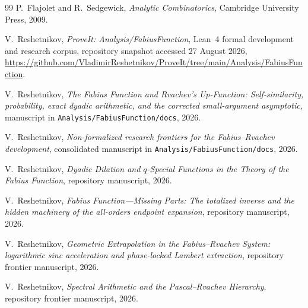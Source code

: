 \documentclass[11pt,oneside]{article}
\theoremstyle{frontier}
\theoremstyle{definition}
\theoremstyle{remark}
\begin{document}
\begin{thebibliography}{99}
P.~Flajolet and R.~Sedgewick,
\newblock \emph{Analytic Combinatorics},
\newblock Cambridge University Press, 2009.

V.~Reshetnikov,
\newblock \emph{ProveIt: Analysis/FabiusFunction},
\newblock Lean~4 formal development and research corpus, repository snapshot accessed
27 August 2026,
\newblock \url{https://github.com/VladimirReshetnikov/ProveIt/tree/main/Analysis/FabiusFunction}.

V.~Reshetnikov,
\newblock \emph{The Fabius Function and Rvachev's Up-Function: Self-similarity, probability,
exact dyadic arithmetic, and the corrected small-argument asymptotic},
\newblock manuscript in \texttt{Analysis/FabiusFunction/docs}, 2026.

V.~Reshetnikov,
\newblock \emph{Non-formalized research frontiers for the Fabius--Rvachev development},
\newblock consolidated manuscript in \texttt{Analysis/FabiusFunction/docs}, 2026.

V.~Reshetnikov,
\newblock \emph{Dyadic Dilation and $q$-Special Functions in the Theory of the Fabius Function},
\newblock repository manuscript, 2026.

V.~Reshetnikov,
\newblock \emph{Fabius Function---Missing Parts: The totalized inverse and the hidden machinery of
the all-orders endpoint expansion},
\newblock repository manuscript, 2026.

V.~Reshetnikov,
\newblock \emph{Geometric Extrapolation in the Fabius--Rvachev System: logarithmic sinc
acceleration and phase-locked Lambert extraction},
\newblock repository frontier manuscript, 2026.

V.~Reshetnikov,
\newblock \emph{Spectral Arithmetic and the Pascal--Rvachev Hierarchy},
\newblock repository frontier manuscript, 2026.

\end{thebibliography}
\end{document}
